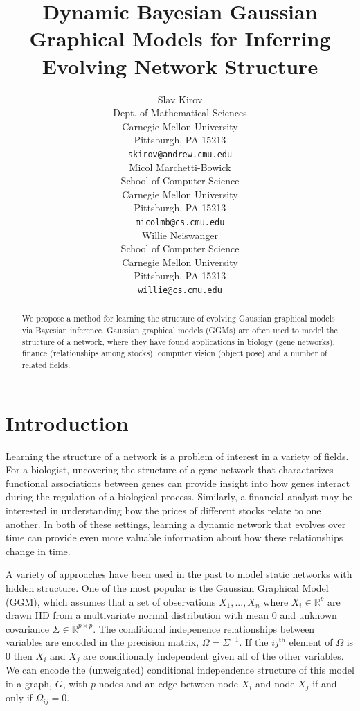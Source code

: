 \documentclass{article}
\title{Dynamic Bayesian Gaussian Graphical Models for Inferring Evolving Network Structure}
\author{ %
Slav Kirov\\
Dept. of Mathematical Sciences\\
Carnegie Mellon University\\
Pittsburgh, PA 15213 \\
\texttt{skirov@andrew.cmu.edu} \\
\And
Micol Marchetti-Bowick\\
School of Computer Science\\
Carnegie Mellon University\\
Pittsburgh, PA 15213 \\
\texttt{micolmb@cs.cmu.edu} \\
\And
Willie Neiswanger\\
School of Computer Science\\
Carnegie Mellon University\\
Pittsburgh, PA 15213 \\
\texttt{willie@cs.cmu.edu} \\
}
\begin{document}
\maketitle

\begin{abstract}
We propose a method for learning the structure of evolving Gaussian graphical models via Bayesian inference. Gaussian graphical models (GGMs) are often used to model the structure of a network, where they have found applications in biology (gene networks), finance (relationships among stocks), computer vision (object pose) and a number of related fields. 
\end{abstract}


\section{Introduction}
\label{sec:intro}

Learning the structure of a network is a problem of interest in a variety of fields. For a biologist, uncovering the structure of a gene network that charactarizes functional associations between genes can provide insight into how genes interact during the regulation of a biological process. 
Similarly, a financial analyst may be interested in understanding how the prices of different stocks relate to one another. 
In both of these settings, learning a dynamic network that evolves over time can provide even more valuable information about how these relationships change in time.

A variety of approaches have been used in the past to model static networks with hidden structure. One of the most popular is the Gaussian Graphical Model (GGM), which assumes that a set of observations $X_1,...,X_n$ where $X_i \in \mathbb{R}^p$ are drawn IID from a multivariate normal distribution with mean $0$ and unknown covariance $\Sigma \in \mathbb{R}^{p \times p}$. The conditional indepenence relationships between variables are encoded in the precision matrix, $\Omega = \Sigma^{-1}$. If the ${ij}^{\text{th}}$ element of $\Omega$ is 0 then $X_i$ and $X_j$ are conditionally independent given all of the other variables. We can encode the (unweighted) conditional independence structure of this model in a graph, $G$, with $p$ nodes and an edge between node $X_i$ and node $X_j$ if and only if $\Omega_{ij} = 0$.
\end{document}
